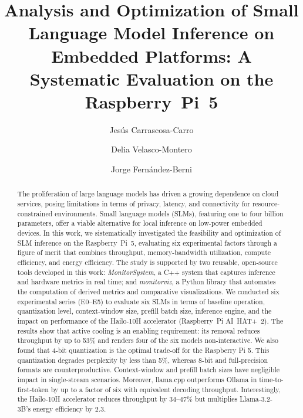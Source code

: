 \documentclass[acmsmall,natbib=false]{acmart}
\begin{document}
\title[SLM Inference on Embedded Platforms]{Analysis and Optimization of Small
Language Model Inference on Embedded Platforms: A Systematic Evaluation on the
Raspberry~Pi~5}

\author{Jesús Carrascosa-Carro}

\author{Delia Velasco-Montero}

\author{Jorge Fernández-Berni}

\renewcommand{\shortauthors}{Carrascosa-Carro et al.}

\begin{abstract}
The proliferation of large language models has driven a growing
dependence on cloud services, posing limitations in terms of privacy, latency,
and connectivity for resource-constrained environments. Small language models
(SLMs), featuring one to four billion parameters, offer a viable alternative for local
inference on low-power embedded devices. In this work, we sistematically investigated
the feasibility and optimization of SLM inference on the Raspberry~Pi~5,
evaluating six experimental factors through a figure of merit that combines
throughput, memory-bandwidth utilization, compute efficiency, and energy
efficiency. The study is supported by two reusable, open-source tools developed in this work:
\textit{MonitorSystem}, a C++ system that captures inference and hardware
metrics in real time; and \textit{monitorviz}, a Python library that automates
the computation of derived metrics and comparative visualizations. We conducted six
experimental series (E0--E5) to evaluate six SLMs in terms of baseline operation, 
quantization level, context-window size, prefill batch size,
inference engine, and the impact on performance of the Hailo-10H accelerator (Raspberry~Pi AI~HAT+~2). 
The results show that active cooling is an enabling requirement: its removal reduces throughput
by up to 53\% and renders four of the six models non-interactive. We also found that 4-bit
quantization is the optimal trade-off for the Raspberry Pi 5.
This quantization degrades perplexity by less than 5\%, whereas 8-bit and full-precision
formats are counterproductive. Context-window and prefill batch sizes have
negligible impact in single-stream scenarios. Moreover, llama.cpp outperforms Ollama in
time-to-first-token by up to a factor of six with equivalent decoding
throughput. Interestingly, the Hailo-10H accelerator reduces throughput by 34--47\% but
multiplies Llama-3.2-3B's energy efficiency by 2.3.
\end{abstract}
\end{document}
